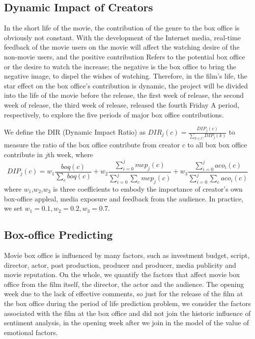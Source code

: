 \subsection{Dynamic Impact of Creators}
\par In the short life of the movie, the contribution of the genre to the box office is obviously not constant. With the development of the Internet media, real-time feedback of the movie users on the movie will affect the watching desire of the non-movie users, and the positive contribution Refers to the potential box office or the desire to watch the increase; the negative is the box office to bring the negative image, to dispel the wishes of watching. Therefore, in the film's life, the star effect on the box office's contribution is dynamic, the project will be divided into the life of the movie before the release, the first week of release, the second week of release, the third week of release, released the fourth Friday A period, respectively, to explore the five periods of major box office contributions. \\
\par We define the DIR (Dynamic Impact Ratio) as $DIR_j(c)=\frac{DIP_j(c)}{\sum_{k\in C}DIP_j(k)}$ to measure the ratio of the box office contribute from creator $c$ to all box box office contribute in $j$th week, where 
\begin{equation}
DIP_j(c)=w_1\frac{boq(c)}{\sum_{c}boq(c)}+w_2\frac{\sum_{i=0}^{j}mep_j(c)}{\sum_{i=0}^{j}\sum_{c}mep_j(c)}+w_3\frac{\sum_{i=0}^{j}aco_i(c)}{\sum_{i=0}^{j}\sum_{c}aco_i(c)}
\end{equation}
where $w_1$,$w_2$,$w_3$ is three coefficients to embody the importance of creator's own box-office appleal, media exposure and feedback from the audience. In practice, we set $w_1=0.1,w_2=0.2,w_3=0.7$.

\subsection{Box-office Predicting}
Movie box office is influenced by many factors, such as investment budget, script, director, actor, post production, producer and producer, media publicity and movie reputation. On the whole, we quantify the factors that affect movie box office from the film itself, the director, the actor and the audience. The opening week due to the lack of effective comments, so just for the release of the film at the box office during the period of life prediction problem, we consider the factors associated with the film at the box office and did not join the historic influence of sentiment analysis, in the opening week after we join in the model of the value of emotional factors.

